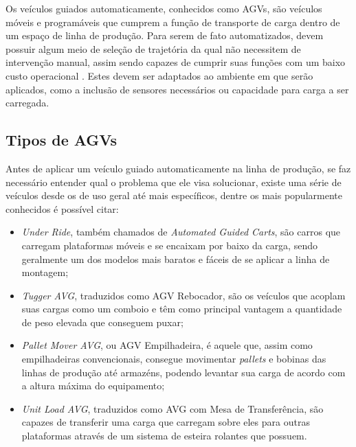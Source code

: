 Os veículos guiados automaticamente, conhecidos como AGVs, são veículos móveis
e programáveis que cumprem a função de transporte de carga dentro de um espaço
de linha de produção. Para serem de fato automatizados, devem possuir algum
meio de seleção de trajetória da qual não necessitem de intervenção manual,
assim sendo capazes de cumprir suas funções com um baixo custo operacional
\cite{kumar2016}. Estes devem ser adaptados ao ambiente em que serão
aplicados, como a inclusão de sensores necessários ou capacidade para carga a
ser carregada.

\subsection{Tipos de AGVs}

Antes de aplicar um veículo guiado automaticamente na linha de produção, se faz
necessário entender qual o problema que ele visa solucionar, existe uma série
de veículos desde os de uso geral até mais específicos, dentre os mais
popularmente conhecidos é possível citar:

\begin{itemize}
        \item \textit{Under Ride}, também chamados de \textit{Automated Guided Carts}, são carros
                que carregam plataformas móveis e se encaixam por baixo da
                carga, sendo geralmente um dos modelos mais baratos e fáceis de
                se aplicar a linha de montagem;

        \item \textit{Tugger AVG}, traduzidos como AGV Rebocador, são os veículos que
                acoplam suas cargas como um comboio e têm como principal
                vantagem a quantidade de peso elevada que conseguem puxar;

        \item \textit{Pallet Mover AVG}, ou AGV Empilhadeira, é aquele que, assim como
                empilhadeiras convencionais, consegue movimentar \textit{pallets} e
                bobinas das linhas de produção até armazéns, podendo levantar
                sua carga de acordo com a altura máxima do equipamento;

        \item \textit{Unit Load AVG}, traduzidos como AVG com Mesa de Transferência, são
                capazes de transferir uma carga que carregam sobre eles para
                outras plataformas através de um sistema de esteira rolantes
                que possuem.

\end{itemize}


